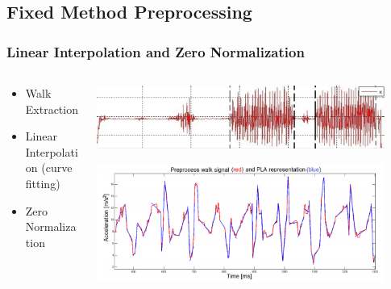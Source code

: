 \documentclass{beamer}
\begin{document}
\subsection{Fixed Method Preprocessing}
\begin{frame}
  \frametitle{Linear Interpolation and Zero Normalization}
  \begin{columns}
  \begin{column}{0.4\textwidth}
  \begin{itemize}
    \item Walk Extraction 
  	\linebreak
  	\item Linear Interpolation (curve fitting)
  	\linebreak
	\item Zero Normalization 
  \end{itemize}
  \end{column}  
  
\begin{column}{0.5\textwidth}

\includegraphics[width=0.91\textwidth]{Illustrations/onegaitcycle.png}

\includegraphics[width=0.91\textwidth]{Illustrations/linear.png}

\end{column}   
  
  \end{columns}
\end{frame}
\end{document}
